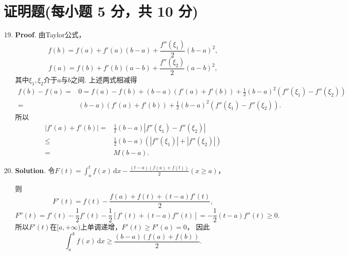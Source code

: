 \documentclass[../main.tex]{subfiles}
\begin{document}
\section{证明题(每小题 5 分，共 10 分)}
\begin{enumerate}
    \setcounter{enumi}{18}
    \item \textbf{Proof}. 由Taylor公式，
          \[
              f(b)=f(a)+f'(a)(b-a)+\frac{f''(\xi_{1})}{2}(b-a)^2,
          \]
          \[
              f(a)=f(b)+f'(b)(a-b)+\frac{f''(\xi_{2})}{2}(a-b)^2,
          \]
          其中$\xi_{1},\xi_{2}$介于$a$与$b$之间. 上述两式相减得
          \[
              \begin{aligned}
                  f(b)-f(a) = {} & 0 = f(a)-f(b) + (b-a)(f'(a)+f'(b)) + \frac{1}{2}(b-a)^{2}(f''(\xi_{1})-f''(\xi_{2})) \\
                  = {}           & (b-a)(f'(a)+f'(b)) + \frac{1}{2}(b-a)^{2}(f''(\xi_{1})-f''(\xi_{2})).
              \end{aligned}
          \]
          所以
          \[
              \begin{aligned}
                  |f'(a)+f'(b)| = {} & \frac{1}{2}(b-a)|f''(\xi_{1})-f''(\xi_{2})|     \\
                  \leq {}            & \frac{1}{2}(b-a)(|f''(\xi_{1})|+|f''(\xi_{2})|) \\
                  = {}               & M(b-a).
              \end{aligned}
          \]

    \item \textbf{Solution}. 令$F(t)=\int_{a}^{t}f(x)\,\mathrm{d}x-\frac{(t-a)(f(a)+f(t))}{2}
              (x\geq a)$，

          则
          \[
              F'(t)=f(t)-\frac{f(a)+f(t)+(t-a)f'(t)}{2},
          \]
          \[
              F''(t)=f'(t)-\frac{1}{2}f'(t)-\frac{1}{2}\left[f'(t)+(t-a)f''(t)\right]=-\frac{1}{2}
              (t-a)f''(t)\geq 0.
          \]
          所以$F'(t)$在$[a,+\infty)$上单调递增，$F'(t)\geq F'(a)=0$， 因此
          \[
              \int_{a}^{b}f(x)\,\mathrm{d}x \geq \frac{(b-a)(f(a)+f(b))}{2}.
          \]
\end{enumerate}
\end{document}
